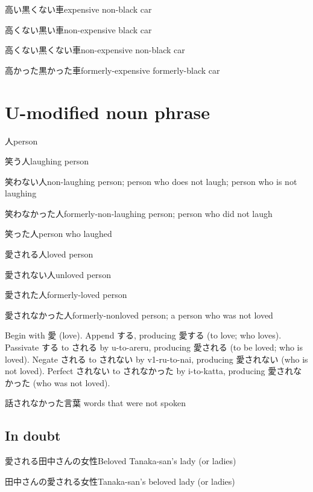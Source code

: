高い黒くない車expensive non-black car

高くない黒い車non-expensive black car

高くない黒くない車non-expensive non-black car

高かった黒かった車formerly-expensive formerly-black car

\section{U-modified noun phrase}

人person

笑う人laughing person

笑わない人non-laughing person; person who does not laugh; person who is not laughing

笑わなかった人formerly-non-laughing person; person who did not laugh

笑った人person who laughed

愛される人loved person

愛されない人unloved person

愛された人formerly-loved person

愛されなかった人formerly-nonloved person; a person who was not loved

Begin with 愛 (love).
Append する, producing 愛する (to love; who loves).
Passivate する to される by u-to-areru, producing 愛される (to be loved; who is loved).
Negate される to されない by v1-ru-to-nai, producing 愛されない (who is not loved).
Perfect されない to されなかった by i-to-katta, producing 愛されなかった (who was not loved).

話されなかった言葉
words that were not spoken

\subsection{In doubt}

愛される田中さんの女性Beloved Tanaka-san's lady (or ladies)

田中さんの愛される女性Tanaka-san's beloved lady (or ladies)
